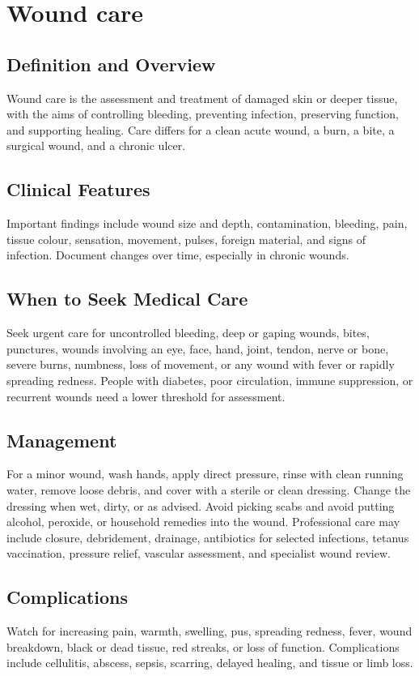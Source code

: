 \chapter{Wound care}
\section*{Definition and Overview}
Wound care is the assessment and treatment of damaged skin or deeper tissue, with the aims of controlling bleeding, preventing infection, preserving function, and supporting healing. Care differs for a clean acute wound, a burn, a bite, a surgical wound, and a chronic ulcer.
\section*{Clinical Features}
Important findings include wound size and depth, contamination, bleeding, pain, tissue colour, sensation, movement, pulses, foreign material, and signs of infection. Document changes over time, especially in chronic wounds.
\section*{When to Seek Medical Care}
Seek urgent care for uncontrolled bleeding, deep or gaping wounds, bites, punctures, wounds involving an eye, face, hand, joint, tendon, nerve or bone, severe burns, numbness, loss of movement, or any wound with fever or rapidly spreading redness. People with diabetes, poor circulation, immune suppression, or recurrent wounds need a lower threshold for assessment.
\section*{Management}
For a minor wound, wash hands, apply direct pressure, rinse with clean running water, remove loose debris, and cover with a sterile or clean dressing. Change the dressing when wet, dirty, or as advised. Avoid picking scabs and avoid putting alcohol, peroxide, or household remedies into the wound. Professional care may include closure, debridement, drainage, antibiotics for selected infections, tetanus vaccination, pressure relief, vascular assessment, and specialist wound review.
\section*{Complications}
Watch for increasing pain, warmth, swelling, pus, spreading redness, fever, wound breakdown, black or dead tissue, red streaks, or loss of function. Complications include cellulitis, abscess, sepsis, scarring, delayed healing, and tissue or limb loss.
